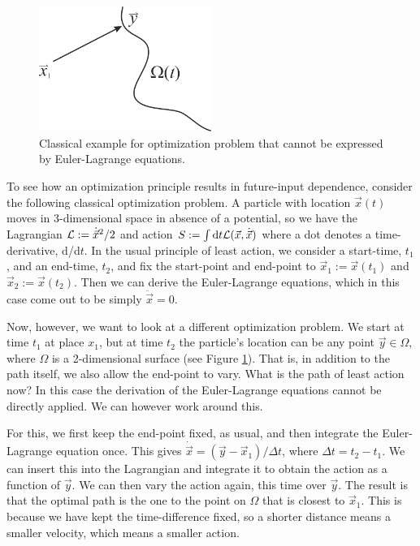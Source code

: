 \documentclass[11pt,twoside,A4]{article}
\begin{document}
\begin{figure}[h]
\centering
\includegraphics[width=0.5\textwidth]{toy02.png}
\caption{Classical example for optimization problem that cannot be expressed by Euler-Lagrange equations.}
\label{toy02}
\end{figure}

To see how an optimization principle results in future-input dependence, consider the following classical optimization problem. A particle with location $\vec{x}(t)$ moves in 3-dimensional space in absence of a potential, so we have the Lagrangian ${\cal L} := \dot{\vec{x}}^2/2$ and action $S:= \int {\rm d}t {\cal{L}}(\vec{x},\dot{\vec x})$ where a dot denotes a time-derivative, d/d$t$. In the usual principle of least action, we consider a start-time, $t_1$, and an end-time, $t_2$, and fix the start-point and end-point to $\vec{x}_1:=\vec{x}(t_1)$ and $\vec{x}_2:=\vec{x}(t_2)$. Then we can derive the Euler-Lagrange equations, which in this case come out to be simply $\ddot{\vec{x}}=0$.

Now, however, we want to look at a different optimization problem. We start at time $t_1$ at place $x_1$, but at time $t_2$ the particle's location can be any point $\vec{y} \in \Omega$, where $\Omega$ is a 2-dimensional surface (see Figure \ref{toy02}). That is, in addition to the path itself, we also allow the end-point to vary. What is the path of least action now?  In this case the derivation of the Euler-Lagrange equations cannot be {directly} applied. We can however work around this. 

For this, we first keep the end-point fixed, as usual, and then integrate the Euler-Lagrange equation once. This gives $\dot{\vec{x}} = (\vec{y}-\vec{x}_1 )/\Delta t$, where $\Delta t = t_2 - t_1$. We can insert this into the Lagrangian and integrate it to obtain the action as a function of $\vec{y}$. We can then vary the action again, this time over $\vec{y}$. The result is that the optimal path is the one to the point on $\Omega$ that is closest to $\vec{x}_1$. This is because we have kept the time-difference fixed, so a shorter distance means a smaller velocity, which means a smaller action. 
\end{document}
